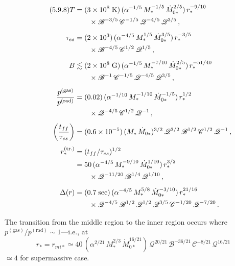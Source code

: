 \begin{align}
\tag{5.9.8}
T &= (3 \times 10^{8}\;\text{K})\,
    (\alpha^{-1/5}\,M_*^{-1/5}\,\dot{M}_{0*}^{2/5})\,
    r_*^{-9/10}\notag \\
  &\qquad \times \mathscr{B}^{-3/5}\,\mathscr{C}^{-1/5}\,
    \mathscr{Q}^{-4/5}\,\mathscr{Q}^{3/5}\,, \notag \\[4pt]
%
\tau_{es} &= (2 \times 10^{3})\,
    (\alpha^{-4/5}\,M_*^{1/5}\,\dot{M}_{0*}^{3/5})\,
    r_*^{-3/5}\notag \\
  &\qquad \times \mathscr{B}^{-4/5}\,\mathscr{C}^{1/2}\,
    \mathscr{Q}^{1/5}\,, \notag \\[4pt]
%
B &\lesssim (2 \times 10^{8}\;\text{G})\,
    (\alpha^{-1/5}\,M_*^{-7/10}\,\dot{M}_{0*}^{2/5})\,
    r_*^{-51/40}\notag \\
  &\qquad \times \mathscr{B}^{-1}\,\mathscr{C}^{-1/5}\,
    \mathscr{Q}^{-4/5}\,\mathscr{Q}^{3/5}\,, \notag \\[4pt]
%
\frac{p^{(\text{gas})}}{p^{(\text{rad})}}
&= (0.02)\,(\alpha^{-1/10}\,M_*^{-1/10}\,\dot{M}_{0*}^{-1/5})\,
   r_*^{1/2}\notag \\
  &\qquad \times \mathscr{Q}^{-4/5}\,\mathscr{C}^{1/2}\,\mathscr{Q}^{-1}\,, \notag \\[4pt]
%
\biggl(\frac{t_{ff}}{\tau_{es}}\biggr)
&= (0.6 \times 10^{-5})\,
  (M_*\,\dot{M}_{0*})^{3/2}\,\mathscr{Q}^{3/2}\,
  \mathscr{B}^{1/2}\,\mathscr{C}^{1/2}\,\mathscr{Q}^{-1}\,, \notag \\[4pt]
%
r_*^{(\text{tr.})} &= (t_{ff}/\tau_{es})^{1/2} \notag \\
&= 50\,(\alpha^{-4/5}\,M_*^{-9/10}\,\dot{M}_{0*}^{1/10})\,
   r_*^{3/2}\notag \\
  &\qquad \times \mathscr{Q}^{-11/20}\,\mathscr{B}^{1/4}\,\mathscr{Q}^{1/10}\,, \notag \\[4pt]
%
\Delta(r)
&= (0.7\;\text{sec})\,(\alpha^{-4/5}\,M_*^{5/8}\,\dot{M}_{0*}^{-3/10})\,
   r_*^{21/16}\notag \\
  &\qquad \times \mathscr{Q}^{-4/5}\,\mathscr{B}^{1/2}\,\mathscr{Q}^{1/2}\,
    \mathscr{Q}^{3/5}\,\mathscr{C}^{-1/20}\,\mathscr{Q}^{-7/20}\,.
   \notag
\end{align}

The transition from the middle region to the inner region occurs where
$p^{(\text{gas})}/p^{(\text{rad})} \sim 1$---i.e., at
%
\begin{equation}
\tag{5.9.9}
r_* = r_{mi*}
\simeq 40\,
(\alpha^{2/21}\,M_*^{2/3}\,\dot{M}_{0*}^{16/21})\,
\mathscr{Q}^{20/21}\,\mathscr{B}^{-36/21}\,\mathscr{C}^{-8/21}\,\mathscr{Q}^{16/21}
\end{equation}
%
$\simeq 4$ for supermassive case.

